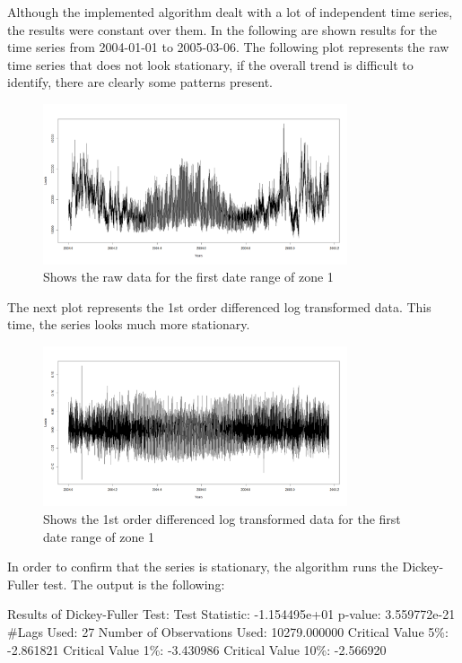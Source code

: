 \documentclass{article} %
\begin{document}
Although the implemented algorithm dealt with a lot of independent time series, the results were constant over them. In the following are shown results for the time series from 2004-01-01 to 2005-03-06.
The following plot represents the raw time series that does not look stationary, if the overall trend is difficult to identify, there are clearly some patterns present.

\begin{figure}
  \centering
    \includegraphics[width=0.80\textwidth]{loadsRawData}
  \caption{Shows the raw data for the first date range of zone 1 }
\end{figure}

The next plot represents the 1st order differenced log transformed data. This time, the series looks much more stationary. 

\begin{figure}
  \centering
    \includegraphics[width=0.80\textwidth]{LoadsStationary}
  \caption{Shows the 1st order differenced log transformed data for the first date range of zone 1 }
\end{figure}

In order to confirm that the series is stationary, the algorithm runs the Dickey-Fuller test. The output is the following:

Results of Dickey-Fuller Test:
Test Statistic: -1.154495e+01
p-value: 3.559772e-21
#Lags Used: 27
Number of Observations Used: 10279.000000
Critical Value 5\%: -2.861821
Critical Value 1\%:  -3.430986
Critical Value 10\%: -2.566920
\end{document}
